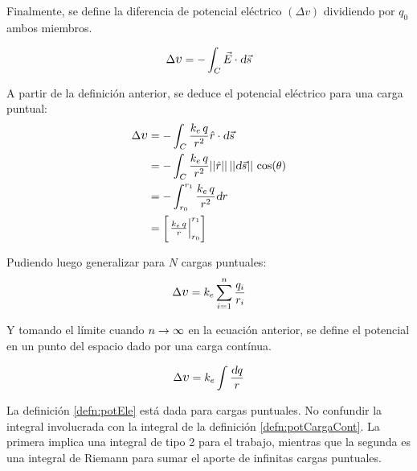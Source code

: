 Finalmente, se define la diferencia de potencial eléctrico $(\Delta v)$ dividiendo por $q_0$ ambos miembros.

\begin{mdframed}[style=DefinitionFrame]
    \begin{defn}
        \label{defn:potEle}
    \end{defn}
    \begin{equation*}
        \Delta \voltage = - \int_C \vec{E} \cdot \dif \vec{s}
    \end{equation*}
\end{mdframed}

A partir de la definición anterior, se deduce el potencial eléctrico para una carga puntual:
\begin{align*}
    \Delta \voltage &= - \int_C \frac{\cstcoulomb \, q}{r^2} \versor{r} \cdot \dif \Vec{s}
    \\
    &= - \int_C \frac{\cstcoulomb \, q}{r^2} \nnorm{\versor{r}} \, \nnorm{\dif \Vec{s}} \, \cos(\theta)
    \\
    &= - \int_{r_0}^{r_1} \frac{\cstcoulomb \, q}{r^2} \dif r
    \\
    &= \barrow{\frac{\cstcoulomb \, q}{r}}{r_0}{r_1}
\end{align*}

Pudiendo luego generalizar para $N$ cargas puntuales:
\begin{equation}
    \Delta \voltage = \cstcoulomb \sum_{\ith=1}^\nth \frac{q_\ith}{r_\ith}
\end{equation}

Y tomando el límite cuando $n\to\infty$ en la ecuación anterior, se define el potencial en un punto del espacio dado por una carga contínua.

\begin{mdframed}[style=DefinitionFrame]
    \begin{defn}
        \label{defn:potCargaCont}
    \end{defn}
    \begin{equation*}
        \Delta \voltage = \cstcoulomb \int \frac{\dif q}{r}
    \end{equation*}
\end{mdframed}

La definición \ref{defn:potEle} está dada para cargas puntuales.
No confundir la integral involucrada con la integral de la definición \ref{defn:potCargaCont}.
La primera implica una integral de tipo 2 para el trabajo, mientras que la segunda es una integral de Riemann para sumar el aporte de infinitas cargas puntuales.

